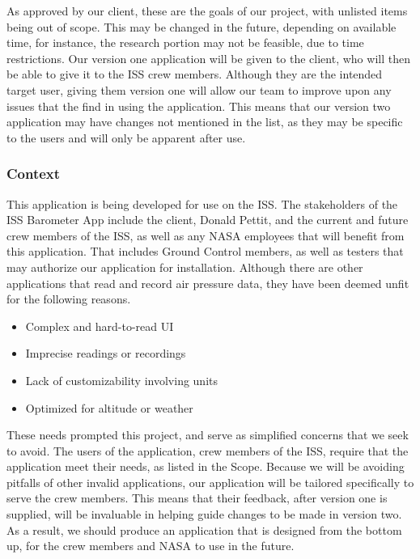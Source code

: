 \documentclass[onecolumn, draftclsnofoot,10pt, compsoc]{IEEEtran}
\def \CapstoneProjectName{ISS Barometer App }
\begin{document}
As approved by our client, these are the goals of our project, with unlisted items being out of scope.
This may be changed in the future, depending on available time, for instance, the research portion may not be feasible, due to time restrictions.
Our version one application will be given to the client, who will then be able to give it to the ISS crew members.
Although they are the intended target user, giving them version one will allow our team to improve upon any issues that the find in using the application.
This means that our version two application may have changes not mentioned in the list, as they may be specific to the users and will only be apparent after use.

\subsubsection{Context}
This application is being developed for use on the ISS.
The stakeholders of the \CapstoneProjectName include the client, Donald Pettit, and the current and future crew members of the ISS, as well as any NASA employees that will benefit from this application.
That includes Ground Control members, as well as testers that may authorize our application for installation.
Although there are other applications that read and record air pressure data, they have been deemed unfit for the following reasons.
\begin{itemize}
	\item Complex and hard-to-read UI
	\item Imprecise readings or recordings
	\item Lack of customizability involving units
	\item Optimized for altitude or weather
\end{itemize}
These needs prompted this project, and serve as simplified concerns that we seek to avoid.
The users of the application, crew members of the ISS, require that the application meet their needs, as listed in the Scope.
Because we will be avoiding pitfalls of other invalid applications, our application will be tailored specifically to serve the crew members.
This means that their feedback, after version one is supplied, will be invaluable in helping guide changes to be made in version two.
As a result, we should produce an application that is designed from the bottom up, for the crew members and NASA to use in the future.
\end{document}
